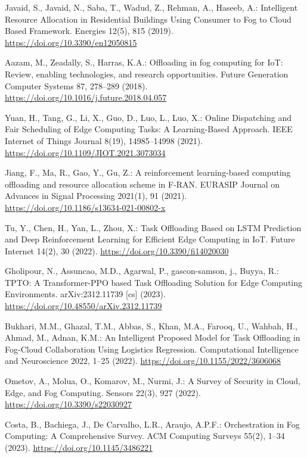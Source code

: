 \documentclass{svproc}
\begin{document}
\begin{thebibliography}{99}
Javaid, S., Javaid, N., Saba, T., Wadud, Z., Rehman, A., Haseeb, A.: Intelligent Resource Allocation in Residential Buildings Using Consumer to Fog to Cloud Based Framework. Energies 12(5), 815 (2019). \url{https://doi.org/10.3390/en12050815}

Aazam, M., Zeadally, S., Harras, K.A.: Offloading in fog computing for IoT: Review, enabling technologies, and research opportunities. Future Generation Computer Systems 87, 278--289 (2018). \url{https://doi.org/10.1016/j.future.2018.04.057}

Yuan, H., Tang, G., Li, X., Guo, D., Luo, L., Luo, X.: Online Dispatching and Fair Scheduling of Edge Computing Tasks: A Learning-Based Approach. IEEE Internet of Things Journal 8(19), 14985--14998 (2021). \url{https://doi.org/10.1109/JIOT.2021.3073034}

Jiang, F., Ma, R., Gao, Y., Gu, Z.: A reinforcement learning-based computing offloading and resource allocation scheme in F-RAN. EURASIP Journal on Advances in Signal Processing 2021(1), 91 (2021). \url{https://doi.org/10.1186/s13634-021-00802-x}

Tu, Y., Chen, H., Yan, L., Zhou, X.: Task Offloading Based on LSTM Prediction and Deep Reinforcement Learning for Efficient Edge Computing in IoT. Future Internet 14(2), 30 (2022). \url{https://doi.org/10.3390/fi14020030}

Gholipour, N., Assuncao, M.D., Agarwal, P., gascon-samson, j., Buyya, R.: TPTO: A Transformer-PPO based Task Offloading Solution for Edge Computing Environments. arXiv:2312.11739 [cs] (2023). \url{https://doi.org/10.48550/arXiv.2312.11739}

Bukhari, M.M., Ghazal, T.M., Abbas, S., Khan, M.A., Farooq, U., Wahbah, H., Ahmad, M., Adnan, K.M.: An Intelligent Proposed Model for Task Offloading in Fog-Cloud Collaboration Using Logistics Regression. Computational Intelligence and Neuroscience 2022, 1--25 (2022). \url{https://doi.org/10.1155/2022/3606068}

Ometov, A., Molua, O., Komarov, M., Nurmi, J.: A Survey of Security in Cloud, Edge, and Fog Computing. Sensors 22(3), 927 (2022). \url{https://doi.org/10.3390/s22030927}

Costa, B., Bachiega, J., De Carvalho, L.R., Araujo, A.P.F.: Orchestration in Fog Computing: A Comprehensive Survey. ACM Computing Surveys 55(2), 1--34 (2023). \url{https://doi.org/10.1145/3486221}


\end{thebibliography}
\end{document}
